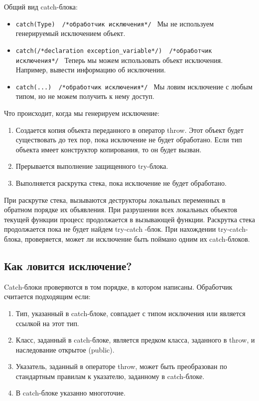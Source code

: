 Общий вид catch-блока:
\begin{itemize}
    \item
    \texttt{catch(Type) { /*обработчик исключения*/ }}
    Мы не используем генерируемый исключением объект.
    \item
    \texttt{catch(/*declaration exception_variable*/) { /*обработчик исключения*/ }} Теперь мы можем использовать объект исключения. Например, вывести информацию об исключении.
    \item
    \texttt{catch(...) { /*обработчик исключения*/ }}
    Мы ловим исключение с любым типом, но не можем получить к нему доступ.
\end{itemize}

Что происходит, когда мы генерируем исключение:
\begin{enumerate}
    \item
    Создается копия объекта переданного в оператор throw. Этот объект будет существовать до тех пор, пока исключение не будет обработано. Если тип объекта имеет конструктор копирования, то он будет вызван.
    \item
    Прерывается выполнение защищенного try-блока.
    \item
    Выполняется раскрутка стека, пока исключение не будет обработано.
\end{enumerate}

При раскрутке стека, вызываются деструкторы локальных переменных в обратном порядке их объявления. При разрушении всех локальных объектов текущей функции процесс продолжается в вызывающей функции. Раскрутка стека продолжается пока не будет найдем try-catch -блок. При нахождении try-catch-блока, проверяется, может ли исключение быть поймано одним их catch-блоков.

\subsection{Как ловится исключение?}

Catch-блоки проверяются в том порядке, в котором написаны. Обработчик считается подходящим если:
\begin{enumerate}
    \item
    Тип, указанный в catch-блоке, совпадает с типом исключения или является ссылкой на этот тип.
    \item
    Класс, заданный в catch-блоке, является предком класса, заданного в throw, и наследование открытое (public).
    \item
    Указатель, заданный в операторе throw, может быть преобразован по стандартным правилам к указателю, заданному в catch-блоке.
    \item
    В catch-блоке указанно многоточие.
\end{enumerate}

